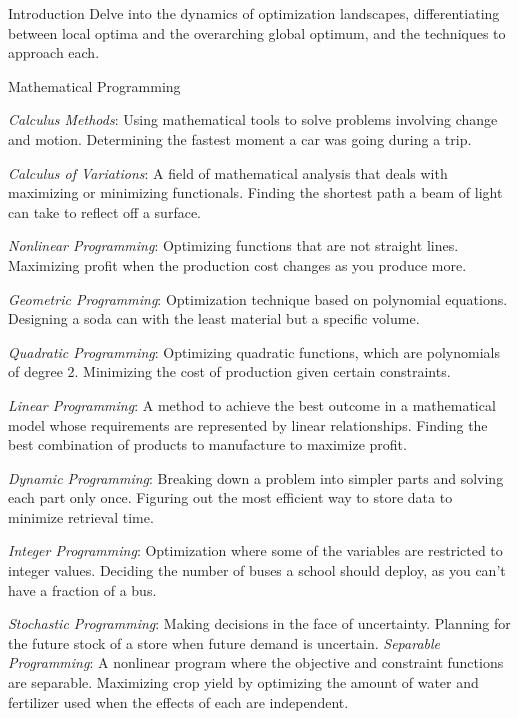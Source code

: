 \documentclass[
    NAME={Dr. Helga Ingimundardóttir},
    EMAIL={helgaingim@hi.is},
    FACULTY={Industrial Engineering},
    TITLE={Local and Global Optimization},
    SUBTITLE={Understanding Optima in Complex Landscapes},
    SEMINAR={VÉL113F},
    DATE={Design and Optimization},
    WIDE=true
]{../HI-latex/hi-beamer}
\begin{document}
    \begin{frame}{Introduction}
        Delve into the dynamics of optimization landscapes, differentiating between local optima and the overarching
        global optimum, and the techniques to approach each.
    \end{frame}

    \begin{frame}{Mathematical Programming}
        \small

        \emph{Calculus Methods}: Using mathematical tools to solve problems involving change and motion.
        \bi Determining the fastest moment a car was going during a trip. \ei

        \emph{Calculus of Variations}: A field of mathematical analysis that deals with maximizing or minimizing functionals.
        \bi Finding the shortest path a beam of light can take to reflect off a surface. \ei

        \emph{Nonlinear Programming}: Optimizing functions that are not straight lines.
        \bi Maximizing profit when the production cost changes as you produce more. \ei

        \emph{Geometric Programming}: Optimization technique based on polynomial equations.
        \bi Designing a soda can with the least material but a specific volume. \ei

        \emph{Quadratic Programming}: Optimizing quadratic functions, which are polynomials of degree 2.
        \bi Minimizing the cost of production given certain constraints. \ei

        \emph{Linear Programming}: A method to achieve the best outcome in a mathematical model whose requirements
        are represented by linear relationships.
        \bi Finding the best combination of products to manufacture to maximize profit. \ei

        \emph{Dynamic Programming}: Breaking down a problem into simpler parts and solving each part only once.
        \bi Figuring out the most efficient way to store data to minimize retrieval time. \ei

        \emph{Integer Programming}: Optimization where some of the variables are restricted to integer values.
        \bi Deciding the number of buses a school should deploy, as you can't have a fraction of a bus. \ei

        \emph{Stochastic Programming}: Making decisions in the face of uncertainty.
        \bi Planning for the future stock of a store when future demand is uncertain. \ei
        \framebreak
        \emph{Separable Programming}: A nonlinear program where the objective and constraint functions are separable.
        \bi Maximizing crop yield by optimizing the amount of water and fertilizer used when the effects of
        each are independent. \ei


\end{frame}
\end{document}
